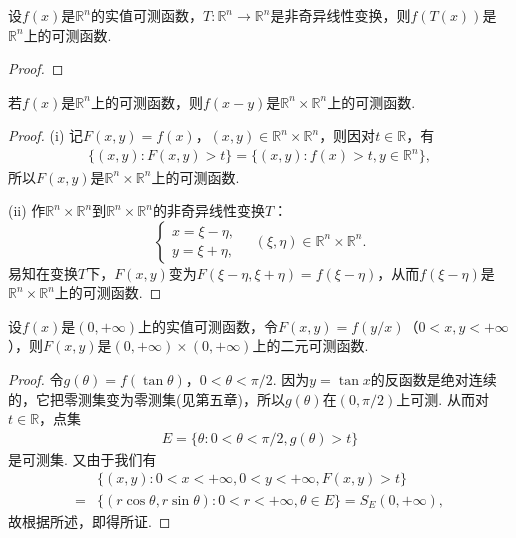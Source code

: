\documentclass[../../main.tex]{subfiles}
\begin{document}
\begin{corollary}
设\(f(x)\)是\(\mathbb{R}^{n}\)的实值可测函数，\(T: \mathbb{R}^{n} \to \mathbb{R}^{n}\)是非奇异线性变换，则\(f(T(x))\)是\(\mathbb{R}^{n}\)上的可测函数.
\end{corollary}
\begin{proof}

\end{proof}

\begin{example}
若\(f(x)\)是\(\mathbb{R}^{n}\)上的可测函数，则\(f(x - y)\)是\(\mathbb{R}^{n} \times \mathbb{R}^{n}\)上的可测函数.
\end{example}
\begin{proof}
(i) 记\(F(x, y) = f(x)\)，\((x, y) \in \mathbb{R}^{n} \times \mathbb{R}^{n}\)，则因对\(t \in \mathbb{R}\)，有
\begin{align*}
\{(x, y): F(x, y) > t\} = \{(x, y): f(x) > t, y \in \mathbb{R}^{n}\},
\end{align*}
所以\(F(x, y)\)是\(\mathbb{R}^{n} \times \mathbb{R}^{n}\)上的可测函数.

(ii) 作\(\mathbb{R}^{n} \times \mathbb{R}^{n}\)到\(\mathbb{R}^{n} \times \mathbb{R}^{n}\)的非奇异线性变换\(T\)：
\[
\begin{cases}
x = \xi - \eta, \\
y = \xi + \eta,
\end{cases}
\quad (\xi, \eta) \in \mathbb{R}^{n} \times \mathbb{R}^{n}.
\]
易知在变换\(T\)下，\(F(x, y)\)变为\(F(\xi - \eta, \xi + \eta) = f(\xi - \eta)\)，从而\(f(\xi - \eta)\)是\(\mathbb{R}^{n} \times \mathbb{R}^{n}\)上的可测函数.
\end{proof}

\begin{example}
设\(f(x)\)是\((0, +\infty)\)上的实值可测函数，令\(F(x, y) = f(y / x)\)（\(0 < x, y < +\infty\)），则\(F(x, y)\)是\((0, +\infty) \times (0, +\infty)\)上的二元可测函数.
\end{example}
\begin{proof}
令\(g(\theta) = f(\tan\theta)\)，\(0 < \theta < \pi / 2\). 因为\(y = \tan x\)的反函数是绝对连续的，它把零测集变为零测集(见第五章)，所以\(g(\theta)\)在\((0, \pi / 2)\)上可测. 从而对\(t \in \mathbb{R}\)，点集
\begin{align*}
E = \{\theta: 0 < \theta < \pi / 2, g(\theta) > t\}
\end{align*}
是可测集. 又由于我们有
\begin{align*}
&\{(x, y): 0 < x < +\infty, 0 < y < +\infty, F(x, y) > t\} \\
=&\{(r\cos\theta, r\sin\theta): 0 < r < +\infty, \theta \in E\} = S_{E}(0, +\infty),
\end{align*}
故根据所述，即得所证.
\end{proof}
\end{document}
